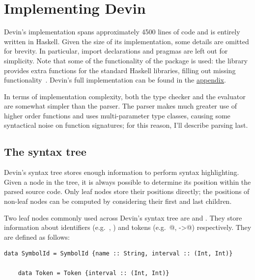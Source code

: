 \documentclass[UdineBachThesis,american,11pt]{PhdThesis}
\begin{document}
  \thispagestyle{empty}

  \chapter{Implementing Devin}

  Devin's implementation spans approximately 4500 lines of code and is entirely
  written in Haskell. Given the size of its implementation, some details are
  omitted for brevity. In particular, import declarations and
  \lstinline@LANGUAGE@ pragmas are left out for simplicity. Note that some of
  the functionality of the package \lstinline@extra@ is used: the library
  provides extra functions for the standard Haskell libraries, filling out
  missing functionality~\cite{extra}. Devin's full implementation can be found
  in the \hyperref[chapter:devin-source-code]{appendix}.

  In terms of implementation complexity, both the type checker and the evaluator
  are somewhat simpler than the parser. The parser makes much greater use of
  higher order functions and uses multi-parameter type classes, causing some
  syntactical noise on function signatures; for this reason, I'll describe
  parsing last.

  \section{The syntax tree}

  Devin's syntax tree stores enough information to perform syntax highlighting.
  Given a node in the tree, it is always possible to determine its position
  within the parsed source code. Only leaf nodes store their positions directly;
  the positions of non-leaf nodes can be computed by considering their first and
  last children.

  Two leaf nodes commonly used across Devin's syntax tree are
  \lstinline@SymbolId@ and \lstinline@Token@. They store information about
  identifiers (e.g.\ \lstinline@x@, \lstinline@Int@) and tokens (e.g.\
  @, \lstinline@->@) respectively. They are defined
  as follows:

  \begin{lstlisting}[gobble=4,basicstyle=\ttfamily\small]
    data SymbolId = SymbolId {name :: String, interval :: (Int, Int)}

    data Token = Token {interval :: (Int, Int)}
  \end{lstlisting}

  \newpage
\end{document}

